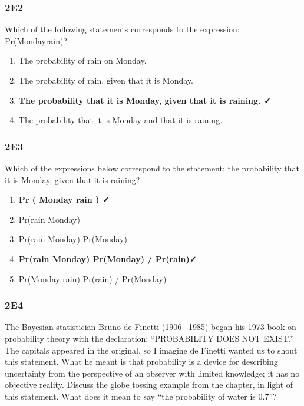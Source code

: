 \documentclass[
]{book}
\providecommand{\tightlist}{%
  \setlength{\itemsep}{0pt}\setlength{\parskip}{0pt}}
\begin{document}
\hypertarget{e2}{%
\subsubsection*{2E2}\label{e2}}

Which of the following statements corresponds to the expression: Pr(Monday\textbar rain)?

\begin{enumerate}
\def\labelenumi{\arabic{enumi}.}
\tightlist
\item
  The probability of rain on Monday.
\item
  The probability of rain, given that it is Monday.
\item
  \textbf{The probability that it is Monday, given that it is raining. ✓}
\item
  The probability that it is Monday and that it is raining.
\end{enumerate}

\hypertarget{e3}{%
\subsubsection*{2E3}\label{e3}}

Which of the expressions below correspond to the statement: the probability that it is Monday, given that it is raining?

\begin{enumerate}
\def\labelenumi{\arabic{enumi}.}
\tightlist
\item
  \textbf{Pr ( Monday \textbar{} rain ) ✓}
\item
  Pr(rain \textbar{} Monday)
\item
  Pr(rain \textbar{} Monday) Pr(Monday)
\item
  \textbf{Pr(rain \textbar{} Monday) Pr(Monday) / Pr(rain)✓}
\item
  Pr(Monday \textbar{} rain) Pr(rain) / Pr(Monday)
\end{enumerate}

\hypertarget{e4}{%
\subsubsection*{2E4}\label{e4}}

The Bayesian statistician Bruno de Finetti (1906-- 1985) began his 1973 book on probability theory with the declaration: ``PROBABILITY DOES NOT EXIST.'' The capitals appeared in the original, so I imagine de Finetti wanted us to shout this statement. What he meant is that probability is a device for describing uncertainty from the perspective of an observer with limited knowledge; it has no objective reality. Discuss the globe tossing example from the chapter, in light of this statement. What does it mean to say ``the probability of water is 0.7''?
\end{document}
